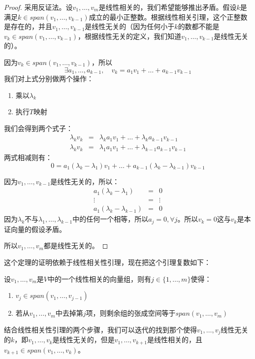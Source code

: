 \documentclass[10pt,a4paper,UTF8]{article}
\begin{document}
\begin{proof}
采用反证法。设\(v_{1},\ldots ,v_{m}\)是线性相关的，我们希望能够推出矛盾。假设\(k\)是满足\(k\in span(v_{1},\ldots ,v_{k-1})\)成立的最小正整数。根据线性相关引理，这个正整数是存在的，并且\(v_{1},\ldots ,v_{k-1}\)是线性无关的（因为任何小于\(k\)的数都不能是\(v_{k}\in span(v_{1},\ldots ,v_{k-1})\)，根据线性无关的定义，我们知道\(v_{1},\ldots ,v_{k-1}\)是线性无关的）。

因为\(v_{k}\in span(v_{1},\ldots ,v_{k-1})\)，所以\[\exists a_{1},\ldots ,a_{k-1}, \quad v_{k} = a_{1}v_{1} + \ldots + a_{k-1}v_{k-1} \]我们对上式分别做两个操作：
\begin{enumerate}
\item 乘以\(\lambda_{k}\)
\item 执行\(T\)映射
\end{enumerate}
我们会得到两个式子：
\begin{eqnarray}
\label{eq:1}
\lambda_{k}v_{k}&=& \lambda_{k}a_{1}v_{1} + \ldots + \lambda_{k}a_{k-1}v_{k-1} \\
\lambda_{k}v_{k}&=& \lambda_{1}a_{1}v_{1} + \ldots + \lambda_{k-1}a_{k-1}v_{k-1}
\end{eqnarray}
两式相减则有：
\begin{equation}
\label{eq:2}
0 = a_{1}(\lambda_{k} - \lambda_{1}) v_{1} + \ldots + a_{k-1}(\lambda_{k} - \lambda_{k-1})v_{k-1}
\end{equation}

因为\(v_{1},\ldots ,v_{k-1}\)是线性无关的，所以：
\begin{eqnarray*}
a_{1}(\lambda_{k} - \lambda_{1})&=&0 \\
\vdots &=& \vdots \\
a_{1}(\lambda_{k} - \lambda_{k-1})&=&0
\end{eqnarray*}
因为\(\lambda_{k}\)不与\(\lambda_{1},\ldots ,\lambda_{k-1}\)中的任何一个相等，所以\(a_{j}=0,\forall j\)。所以\(v_{k} = 0\)这与\(v_{k}\)是本证向量的假设矛盾。

所以\(v_{1},\ldots ,v_{m}\)都是线性无关的。
\end{proof}
这个定理的证明依赖于线性相关性引理，现在把这个引理复数如下：
\begin{theorem}
设\(v_{1},\ldots ,v_{m}\)是\(V\)中的一个线性相关的向量组，则有\(j\in \{1,\ldots ,m\}\)使得：
\begin{enumerate}
\item \(v_{j}\in span(v_{1},\ldots ,v_{j-1})\)
\item 若从\(v_{1},\ldots ,v_{m}\)中去掉第\(j\)项，则剩余组的张成空间等于\(span(v_{1},\ldots ,v_{m})\)
\end{enumerate}
\end{theorem}
结合线性相关性引理的两个步骤，我们可以迭代的找到那个使得\(v_{1},\ldots ,v_{j}\)线性无关的\(k\)，即\(v_{1},\ldots ,v_{k}\)是线性无关的，但是\(v_{1},\ldots ,v_{k+1}\)是线性相关的，且\(v_{k+1}\in span(v_{1},\ldots ,v_{k})\)。
\end{document}
